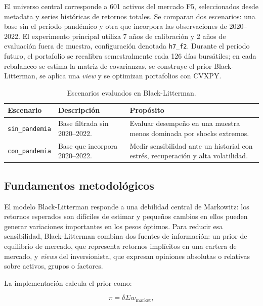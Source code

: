 El universo central corresponde a 601 activos del mercado F5, seleccionados
desde metadata y series hist\'oricas de retornos totales. Se comparan dos
escenarios: una base sin el periodo pand\'emico y otra que incorpora las
observaciones de 2020--2022. El experimento principal utiliza 7 a\~nos de
calibraci\'on y 2 a\~nos de evaluaci\'on fuera de muestra, configuraci\'on denotada
\texttt{h7\_f2}. Durante el periodo futuro, el portafolio se recalibra
semestralmente cada 126 d\'ias burs\'atiles; en cada rebalanceo se estima la matriz
de covarianzas, se construye el prior Black-Litterman, se aplica una
\textit{view} y se optimizan portafolios con CVXPY.

\begin{table}[H]
\centering
\caption{Escenarios evaluados en Black-Litterman.}
\label{tab:anexo4_bl_escenarios}
\small
\begin{tabular}{@{}p{}p{}p{}@{}}
\toprule
Escenario & Descripci\'on & Prop\'osito \\
\midrule
\texttt{sin\_pandemia} & Base filtrada sin 2020--2022. & Evaluar desempe\~no en una muestra menos dominada por shocks extremos. \\
\texttt{con\_pandemia} & Base que incorpora 2020--2022. & Medir sensibilidad ante un historial con estr\'es, recuperaci\'on y alta volatilidad. \\
\bottomrule
\end{tabular}
\end{table}

\subsection*{Fundamentos metodol\'ogicos}

El modelo Black-Litterman responde a una debilidad central de Markowitz: los
retornos esperados son dif\'iciles de estimar y peque\~nos cambios en ellos pueden
generar variaciones importantes en los pesos \'optimos. Para reducir esa
sensibilidad, Black-Litterman combina dos fuentes de informaci\'on: un prior de
equilibrio de mercado, que representa retornos impl\'icitos en una cartera de
mercado, y \textit{views} del inversionista, que expresan opiniones absolutas o
relativas sobre activos, grupos o factores.

La implementaci\'on calcula el prior como:

\begin{equation}
\pi = \delta \Sigma w_{\text{market}},
\end{equation}

